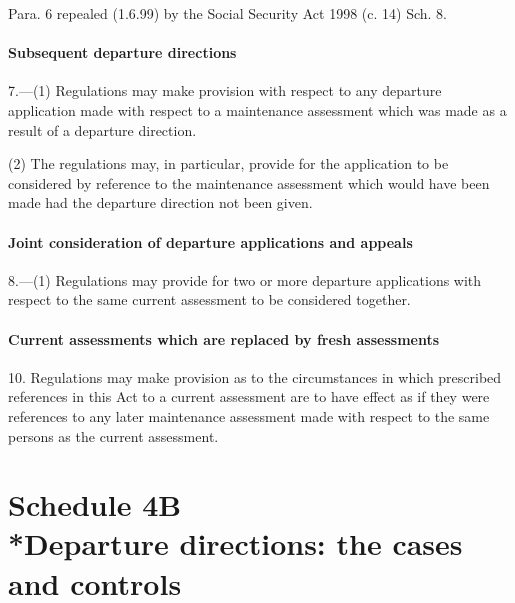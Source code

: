 \documentclass[a4paper]{article}
\begin{document}
{{\medskip

Para. 6 repealed (1.6.99) by the Social Security Act 1998 (c. 14) Sch. 8.

}

\subsection*{Subsequent departure directions}

7.—(1) Regulations may make provision with respect to any departure application
made with respect to a maintenance assessment which was made as a result of a departure
direction.

(2) The regulations may, in particular, provide for the application to be considered by reference to the maintenance assessment which would have been made had the departure direction not been given.

\subsection*{Joint consideration of departure applications and appeals}

8.—(1) Regulations may provide for two or more departure applications with respect to the same current assessment to be considered together.


\subsection*{Current assessments which are replaced by fresh assessments}

10. Regulations may make provision as to the circumstances in which prescribed references in this Act to a current assessment are to have effect as if they were references to any later maintenance assessment made with respect to the same persons as the current assessment.

\part[Schedule 4B --- Departure directions: the cases and controls]{Schedule 4B\\*Departure directions: the cases and controls}

}
\end{document}
